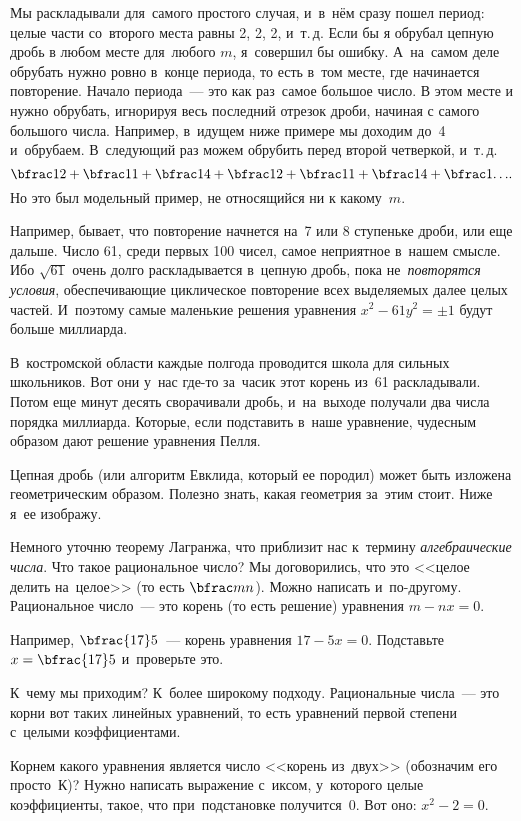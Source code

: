 Мы раскладывали для~самого простого случая, и~в~нём сразу пошел период: целые части со~второго
места равны 2, 2, 2, и~т.\,д. Если бы я обрубал цепную дробь в любом месте  для~любого $m$,
я~совершил бы ошибку. А~на~самом деле обрубать нужно ровно в~конце периода, то есть в~том месте,
где начинается повторение. Начало периода~--- это как раз~самое большое число. В этом месте и нужно
обрубать, игнорируя весь последний отрезок дроби, начиная с самого большого числа. Например,
в~идущем ниже примере мы доходим до~4 и~обрубаем. В~следующий раз можем обрубить перед второй
четверкой, и~т.\,д.
$$
\bfrac1{2+\bfrac1{1+\bfrac1{4+\bfrac1{2+\bfrac1{1+\bfrac1{4+\bfrac1{\ldots}}}}}}}.
$$
Но это был модельный пример, не относящийся ни к какому~$m$.

Например, бывает, что повторение начнется на~7 или 8 ступеньке дроби, или еще дальше. Число 61,
среди первых 100 чисел, самое неприятное в~нашем смысле. Ибо $\sqrt{61}$ очень долго раскладывается
в~цепную дробь, пока не~\textit{повторятся условия}, обеспечивающие циклическое повторение всех
выделяемых далее целых частей. И~поэтому самые маленькие решения уравнения $x^{2}-61y^{2}=\pm1$
будут больше миллиарда.

В~костромской области каждые полгода проводится школа для сильных школьников. Вот они у~нас где-то
за~часик этот корень из~61 раскладывали. Потом еще минут десять сворачивали дробь, и~на~выходе
получали два числа порядка миллиарда. Которые, если подставить в~наше уравнение, чудесным образом
дают решение уравнения Пелля.

Цепная дробь (или алгоритм Евклида, который ее породил) может быть изложена геометрическим образом.
Полезно знать, какая геометрия за~этим стоит. Ниже я~ее изображу.

Немного уточню теорему Лагранжа, что приблизит нас к~термину \textit{алгебраические числа}. Что такое
рациональное число? Мы договорились, что это <<целое делить на~целое>> (то есть $\bfrac mn$). Можно
написать и~по-другому. Рациональное число~--- это корень (то есть решение) уравнения $m-nx=0$.

Например, $\bfrac{17}5$~--- корень уравнения $17-5x=0$. Подставьте $x=\bfrac{17}5$ и~проверьте это.

К~чему мы приходим? К~более широкому подходу. Рациональные числа~--- это корни вот таких линейных
уравнений, то есть уравнений первой степени с~целыми коэффициентами.


Корнем какого уравнения является число <<корень из~двух>> (обозначим его просто~К)? Нужно написать
выражение с~иксом, у~которого целые коэффициенты, такое, что при~подстановке получится~0. Вот оно:
$x^{2}-2=0$.

